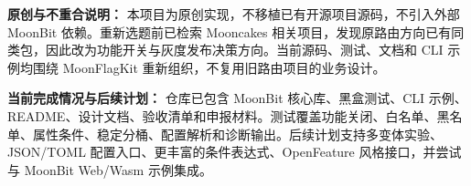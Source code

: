 \documentclass[UTF8,a4paper,11pt]{ctexart}
\begin{document}
\textbf{原创与不重合说明：}
本项目为原创实现，不移植已有开源项目源码，不引入外部 MoonBit 依赖。重新选题前已检索 Mooncakes 相关项目，发现原路由方向已有同类包，因此改为功能开关与灰度发布决策方向。当前源码、测试、文档和 CLI 示例均围绕 MoonFlagKit 重新组织，不复用旧路由项目的业务设计。

\textbf{当前完成情况与后续计划：}
仓库已包含 MoonBit 核心库、黑盒测试、CLI 示例、README、设计文档、验收清单和申报材料。测试覆盖功能关闭、白名单、黑名单、属性条件、稳定分桶、配置解析和诊断输出。后续计划支持多变体实验、JSON/TOML 配置入口、更丰富的条件表达式、OpenFeature 风格接口，并尝试与 MoonBit Web/Wasm 示例集成。
\end{document}
